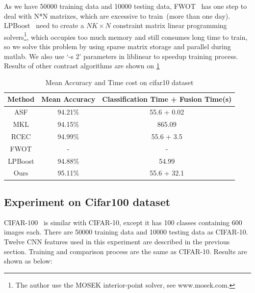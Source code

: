 \documentclass[letterpaper]{article}
\begin{document}
As we have 50000 training data and 10000 testing data, FWOT~\cite{xuiccv2013feature} has one step to deal with N*N matrixes, which are excessive to train~(more than one day). 
LPBoost~\cite{gehler2009feature} need to create a $NK\times N$ constraint matrix linear programming solvers\footnote{The author use the MOSEK interior-point solver, see www.mosek.com.}, which occupies too much memory and still consumes long time to train, so we solve this problem by using sparse matrix storage and parallel during matlab. 
We also use `-s 2' parameters in liblinear to speedup training process. Results of other contrast algorithms are shown on \ref{table:cifar10}


\begin{table}[h]\scriptsize
\centering
\label{table:cifar10}
\begin{tabular}{c|c|c}
\hline
Method  & Mean Accuracy     & Classification Time + Fusion Time(s)\\\hline
ASF     & 94.21\%           & 55.6 + 0.02                         \\
MKL     & 94.15\%           & 865.09                              \\
RCEC    & 94.99\%           & 55.6 + 3.5                          \\         %
FWOT    & -                 & -                                   \\
LPBoost & 94.88\%           & 54.99                               \\\hline
Ours    & 95.11\%           & 55.6 + 32.1                         \\         %
\hline
\end{tabular}
\caption{Mean Accuracy and Time cost on cifar10 dataset}
\end{table}

\subsection{Experiment on Cifar100 dataset}

CIFAR-100~\cite{krizhevsky2009learning} is similar with CIFAR-10, except it has 100 classes containing 600 images each.
There are 50000 training data and 10000 testing data as CIFAR-10. 
Twelve CNN features used in this experiment are described in the previous section. 
Training and comparison process are the same as CIFAR-10. Results are shown as below:
\end{document}
